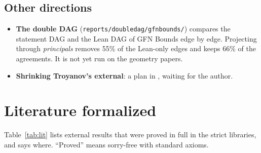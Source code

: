 \subsection{Other directions}

\begin{itemize}
\item \textbf{The double DAG} (\texttt{reports/doubledag/gfnbounds/}) compares the statement DAG
  and the Lean DAG of GFN Bounds edge by edge. Projecting through \emph{principals} removes 55\%
  of the Lean-only edges and keeps 66\% of the agreements. It is not yet run on the geometry
  papers.
\item \textbf{Shrinking Troyanov's external}: a plan in
  , waiting for the author.
\end{itemize}

\section{Literature formalized}\label{sec:lit}

Table~\ref{tab:lit} lists external results that were proved in full in the strict libraries, and
says where. ``Proved'' means sorry-free with standard axioms.


